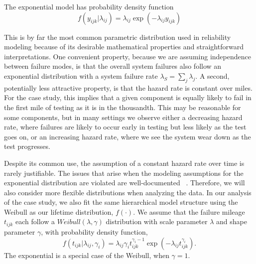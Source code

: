 \documentclass[12pt]{article}
\begin{document}
The exponential model has probability density function
\begin{equation*}
    f(y_{ijk}|\lambda_{ij})=\lambda_{ij} \exp(-\lambda_{ij}y_{ijk})
\end{equation*}

This is by far the most common parametric distribution used in reliability
modeling because of its desirable mathematical properties and straightforward interpretations.  One convenient property, because we are assuming
independence between failure modes, is that the overall system failures also follow
an exponential distribution with a system failure rate $\lambda_S =
\sum_{j}\lambda_{j}$.  A second, potentially less attractive property, is that the hazard rate is constant over miles.  For the case study, this implies that a given
component is equally likely to fail in the first mile of testing as it is in the thousandth.  This may be reasonable for some components, but in many settings we observe either a decreasing hazard rate, where failures are likely to
occur early in testing but less likely as the test goes on, or an increasing hazard rate, where we see the system wear down as the test progresses.

Despite its common use, the assumption of a constant hazard rate over time is rarely justifiable. The issues that arise when the modeling assumptions for the exponential distribution are violated are well-documented ~\cite{ref3}. Therefore, we will also consider more flexible distributions when analyzing the data.  In our analysis of the case study, we also fit the same hierarchical model structure using the Weibull as our
lifetime distribution, $f(\cdot)$. We assume that the failure mileage $t_{ijk}$ each follow a $Weibull(\lambda, \gamma)$ distribution with scale
parameter $\lambda$ and shape parameter $\gamma$, with probability density
function,
\begin{equation*}
    f(t_{ijk}|\lambda_{ij},\gamma_{i})=\lambda_{ij}\gamma_{i}
    t_{ijk}^{\gamma_{i}-1}\exp(-\lambda_{ij} t_{ijk}^{\gamma_{i}}).
\end{equation*}
The exponential is a special case of the Weibull, when $\gamma = 1$.
\end{document}
